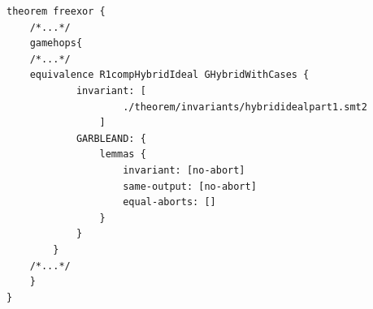 \begin{longlisting}
\begin{verbatim}
theorem freexor {
    /*...*/
    gamehops{
    /*...*/
    equivalence R1compHybridIdeal GHybridWithCases {
            invariant: [
                    ./theorem/invariants/hybrididealpart1.smt2
                ]
            GARBLEAND: {
                lemmas {
                    invariant: [no-abort]
                    same-output: [no-abort]
                    equal-aborts: []
                }
            }
        }
    /*...*/
    }
}
\end{verbatim}
\caption{Game hop 3 in the  theorem}
\label{lst:domino-freexor-gamehop2}
\end{longlisting}